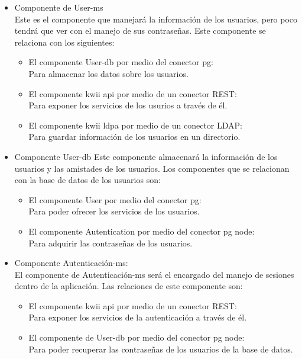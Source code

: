 \begin{itemize}
    \item Componente de User-ms\\
    Este es el componente que manejará la información de los usuarios, pero poco tendrá que ver con el manejo de sus contraseñas.
    Este componente se relaciona con los siguientes:
    \begin{itemize}
        \item El componente User-db por medio del conector pg:\\
        Para almacenar los datos sobre los usuarios.
        \item El componente kwii \textunderscore api por medio de un conector REST:\\
        Para exponer los servicios de los usurios a través de él.
        \item El componente kwii \textunderscore ldpa por medio de un conector LDAP:\\
        Para guardar información de los usuarios en un directorio.
    \end{itemize}
    \item Componente User-db
    Este componente almacenará la información de los usuarios y las amistades de los usuarios.
    Los componentes que se relacionan con la base de datos de los usuarios son:
    \begin{itemize}
        \item El componente User por medio del conector pg:\\
        Para poder ofrecer los servicios de los usuarios.
        \item El componente Autentication por medio del conector pg node:\\
        Para adquirir las contraseñas de los usuarios.
    \end{itemize}
    \item Componente Autenticación-ms:\\
    El componente de Autenticación-ms será el encargado del manejo de sesiones dentro de la aplicación.
    Las relaciones de este componente son:
    \begin{itemize}
        \item El componente kwii \textunderscore api por medio de un conector REST:\\
        Para exponer los servicios de la autenticación a través de él.
        \item El componente de User-db por medio del conector pg node:\\
        Para poder recuperar las contraseñas de los usuarios de la base de datos.

\end{itemize}
\end{itemize}
